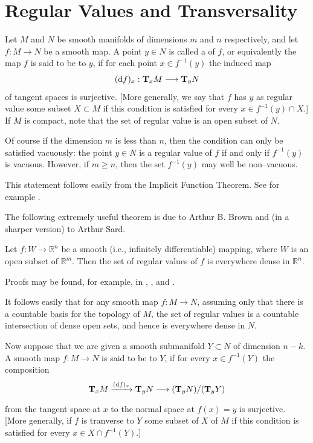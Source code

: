 \documentclass[../main]{subfiles}
\begin{document}
\section{Regular Values and Transversality}
Let $M$ and $N$ be smooth manifolds of dimensions $m$ and $n$ respectively, and let $f : M \longrightarrow N$ be a smooth map. A point $y \in N$ is called a  of $f$, or equivalently the map $f$ is said to be  to $y$, if for each point $x \in f^{-1}(y)$ the induced map \[(\dd f)_x : \tangentspace M x \longrightarrow \tangentspace N y\] of tangent spaces is surjective. [More generally, we say that $f$ has $y$ as regular value  some subset $X \subset M$ if this condition is satisfied for every $x \in f^{-1}(y) \cap X$.] If $M$ is compact, note that the set of regular value is an open subset of $N$. 

Of course if the dimension $m$ is less than $n$, then the condition can only be satisfied vacuously: the point $y \in N$ is a regular value of $f$ if and only if $f^{-1}(y)$ is vacuous. However, if $m \ge n$, then the set $f^{-1}(y)$ may well be non--vacuous. 

 This statement follows easily from the Implicit Function Theorem. See for example \cite[p. 138]{graves}. 

The following extremely useful theorem is due to Arthur B. Brown and (in a sharper version) to Arthur Sard.
\begin{theorem*}[Brown]\label{brown}
Let $f : W \longrightarrow {\mathbb R}^n$ be a smooth (i.e., infinitely differentiable) mapping, where $W$ is an open subset of ${\mathbb R}^m$. Then the set of regular values of $f$ is everywhere dense in ${\mathbb R}^n$. 
\end{theorem*}

Proofs may be found, for example, in \cite{brown}, \cite{sard},\cite{sternberg1999lectures} and \cite{milnor1965}.

It follows easily that for any smooth map $f : M \longrightarrow N$, assuming only that there is a countable basis for the topology of $M$, the set of regular values is a countable intersection of dense open sets, and hence is everywhere dense in $N$. 

Now suppose that we are given a smooth submanifold $Y \subset N$ of dimension $n - k$. A smooth map $f : M \longrightarrow N$ is said to be  to $Y$, if for every $x \in f^{-1}(Y)$ the composition \[\tangentspace M x \varrightarrow{(\dd f)_x} \tangentspace N y \varrightarrow{} (\tangentspace N y)/(\tangentspace Y y)\] from the tangent space at $x$ to the normal space at $f(x) = y$ is surjective. [More generally, if $f$ is tranverse to $Y$  some subset of $X$ of $M$ if this condition is satisfied for every $x \in X \cap f^{-1}(Y)$.]
\end{document}
